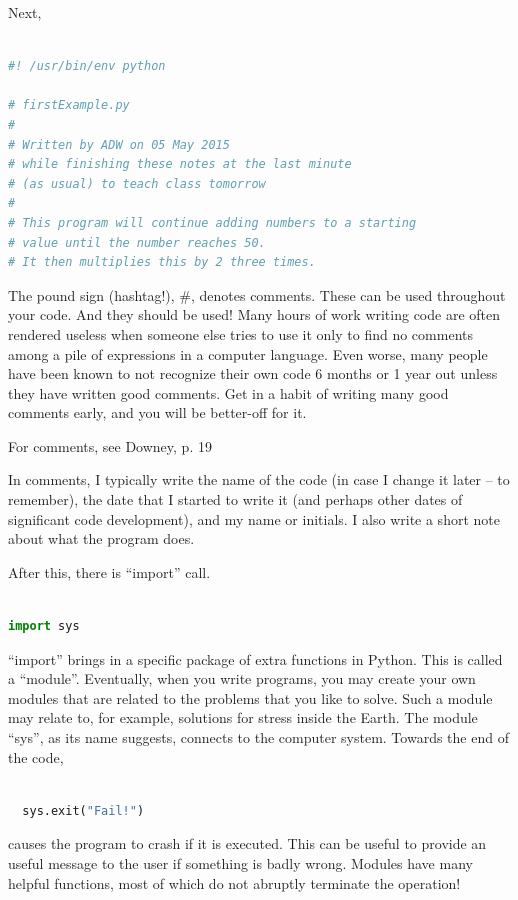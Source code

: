 \documentclass[a4paper,10pt]{scrartcl}
\begin{document}
Next,
\begin{lstlisting}[belowskip=-1.6\baselineskip, language=python]

#! /usr/bin/env python

# firstExample.py
# 
# Written by ADW on 05 May 2015
# while finishing these notes at the last minute
# (as usual) to teach class tomorrow
# 
# This program will continue adding numbers to a starting
# value until the number reaches 50.
# It then multiplies this by 2 three times.
\end{lstlisting}
The pound sign (hashtag!), \#, denotes comments. These can be used throughout your code. And they should be used! Many hours of work writing code are often rendered useless when someone else tries to use it only to find no comments among a pile of expressions in a computer language. Even worse, many people have been known to not recognize their own code 6 months or 1 year out unless they have written good comments. Get in a habit of writing many good comments early, and you will be better-off for it.

\begin{framed}
For comments, see Downey, p. 19
\end{framed}

In comments, I typically write the name of the code (in case I change it later -- to remember), the date that I started to write it (and perhaps other dates of significant code development), and my name or initials. I also write a short note about what the program does.

After this, there is ``import'' call.
\begin{lstlisting}[belowskip=-1.6\baselineskip, language=python]

import sys
\end{lstlisting}
``import'' brings in a specific package of extra functions in Python. This is called a ``module''. Eventually, when you write programs, you may create your own modules that are related to the problems that you like to solve. Such a module may relate to, for example, solutions for stress inside the Earth. The module ``sys'', as its name suggests, connects to the computer system. Towards the end of the code,
\begin{lstlisting}[belowskip=-1.6\baselineskip, language=python]

  sys.exit("Fail!")
\end{lstlisting}
causes the program to crash if it is executed. This can be useful to provide an useful message to the user if something is badly wrong. Modules have many helpful functions, most of which do not abruptly terminate the operation!
\end{document}
